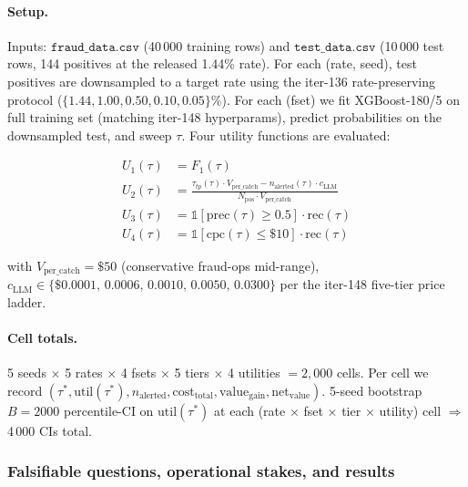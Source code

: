 \documentclass{article}
\begin{document}
\paragraph{Setup.}
Inputs: $\mathtt{fraud\_data.csv}$ (40\,000 training rows) and
$\mathtt{test\_data.csv}$ (10\,000 test rows, 144 positives at the
released 1.44\% rate). For each (rate, seed), test positives are
downsampled to a target rate using the iter-136 rate-preserving protocol
($\{1.44, 1.00, 0.50, 0.10, 0.05\}\%$). For each (fset) we fit
XGBoost-180/5 on full training set (matching iter-148 hyperparams), predict
probabilities on the downsampled test, and sweep $\tau$. Four utility
functions are evaluated:

\begin{align}
U_1(\tau)  &= F_1(\tau)                                                     \tag{F1} \\
U_2(\tau)  &= \frac{\tau_{tp}(\tau) \cdot V_{\text{per\_catch}} -
                    n_{\text{alerted}}(\tau) \cdot c_{\text{LLM}}}
                    {N_{\text{pos}} \cdot V_{\text{per\_catch}}}            \tag{VALUE} \\
U_3(\tau)  &= \mathbb{1}[\mathrm{prec}(\tau) \geq 0.5] \cdot \mathrm{rec}(\tau) \tag{PREC-CONSTRAINED} \\
U_4(\tau)  &= \mathbb{1}[\mathrm{cpc}(\tau) \leq \$10] \cdot \mathrm{rec}(\tau) \tag{COST-CONSTRAINED}
\end{align}

with $V_{\text{per\_catch}} = \$50$ (conservative fraud-ops mid-range),
$c_{\text{LLM}} \in \{\$0.0001,\,0.0006,\,0.0010,\,0.0050,\,0.0300\}$ per
the iter-148 five-tier price ladder.

\paragraph{Cell totals.} 5 seeds $\times$ 5 rates $\times$ 4 fsets
$\times$ 5 tiers $\times$ 4 utilities $= 2{,}000$ cells. Per cell we
record $(\tau^*, \mathrm{util}(\tau^*), n_{\text{alerted}},
\mathrm{cost}_{\text{total}}, \mathrm{value}_{\text{gain}},
\mathrm{net}_{\text{value}})$. 5-seed bootstrap $B=2000$
percentile-CI on $\mathrm{util}(\tau^*)$ at each
(rate $\times$ fset $\times$ tier $\times$ utility) cell $\Rightarrow$
4\,000 CIs total.

\subsubsection{Falsifiable questions, operational stakes, and results}
\end{document}
